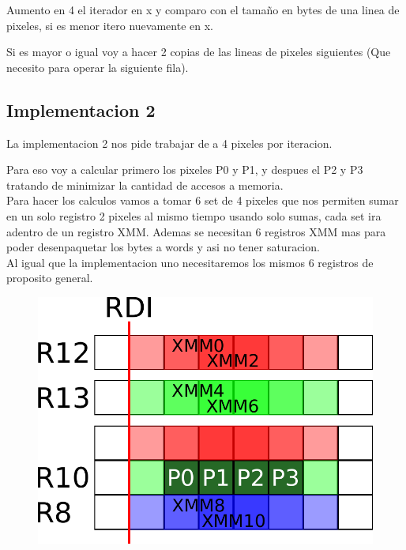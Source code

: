 Aumento en 4 el iterador en x y comparo con el tamaño en bytes de una linea de pixeles, si es menor itero nuevamente en x.

Si es mayor o igual voy a hacer 2 copias de las lineas de pixeles siguientes (Que necesito para operar la siguiente fila).

\subsection{Implementacion 2}
La implementacion 2 nos pide trabajar de a 4 pixeles por iteracion.

Para eso voy a calcular primero los pixeles P0 y P1, y despues el P2 y P3 tratando de minimizar la cantidad de accesos a memoria. \\

Para hacer los calculos vamos a tomar 6 set de 4 pixeles que nos permiten sumar en un solo registro 2 pixeles al mismo tiempo usando solo sumas, cada set ira adentro de un registro XMM. Ademas se necesitan 6 registros XMM mas para poder desenpaquetar los bytes a words y asi no tener saturacion. \\

Al igual que la implementacion uno necesitaremos los mismos 6 registros de proposito general. \\

\begin{figure}[h!]
	\centering
	\includegraphics[scale=0.5]{images/BlurASM2_0}
\end{figure}